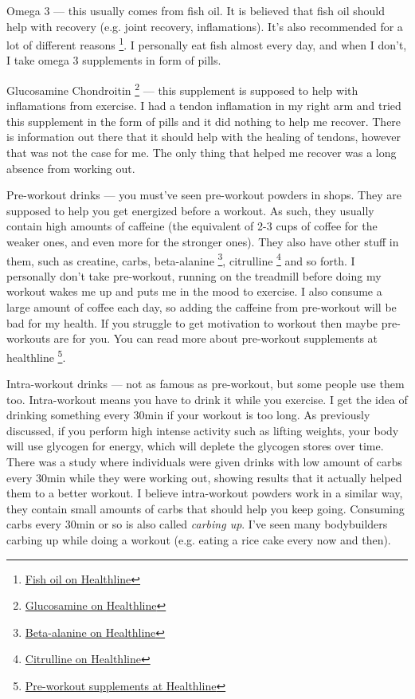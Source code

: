 \documentclass[openany, 12pt]{book}
\begin{document}
        Omega 3 --- this usually comes from fish oil. It is believed that fish oil should help with recovery (e.g. joint recovery, inflamations). It's also recommended for a lot of different reasons
        \footnote{\href{https://www.healthline.com/nutrition/fish-oil-bodybuilding}{Fish oil on Healthline}}. I personally eat fish almost every day, and when I don't, I take
        omega 3 supplements in form of pills.

        Glucosamine Chondroitin
        \footnote{\href{https://www.healthline.com/nutrition/glucosamine}{Glucosamine on Healthline}} --- this supplement is supposed to help with inflamations from exercise.
        I had a tendon inflamation in my right arm and tried this supplement in the form of pills and it did nothing to help me recover. There is information out there that it should help with
        the healing of tendons, however that was not the case for me. The only thing that helped me recover was a long absence from working out.

        Pre-workout drinks --- you must've seen pre-workout powders in shops. They are supposed to help you get energized before a workout. As such, they usually contain high amounts of caffeine
        (the equivalent of 2-3 cups of coffee for the weaker ones, and even more for the stronger ones). They also have other stuff in them, such as creatine, carbs, beta-alanine
        \footnote{\href{https://www.healthline.com/nutrition/beta-alanine-101}{Beta-alanine on Healthline}}, citrulline
        \footnote{\href{https://www.healthline.com/nutrition/citrulline-supplements}{Citrulline on Healthline}} and so forth. I personally don't take pre-workout, running on the treadmill
        before doing my workout wakes me up and puts me in the mood to exercise. I also consume a large amount of coffee each day, so adding the caffeine from pre-workout will be bad for my health.
        If you struggle to get motivation to workout then maybe pre-workouts are for you. You can read more about pre-workout supplements at healthline
        \footnote{\href{https://www.healthline.com/nutrition/best-pre-workout-supplements}{Pre-workout supplements at Healthline}}.

        Intra-workout drinks --- not as famous as pre-workout, but some people use them too. Intra-workout means you have to drink it while you exercise. I get the idea of drinking something every 30min
        if your workout is too long. As previously discussed, if you perform high intense activity such as lifting weights, your body will use glycogen for energy, which will deplete the glycogen stores
        over time. There was a study where individuals were given drinks with low amount of carbs every 30min while they were working out, showing results that it actually helped them to a better
        workout. I believe intra-workout powders work in a similar way, they contain small amounts of carbs that should help you keep going. Consuming carbs every 30min or so is also
        called \textit{carbing up}. I've seen many bodybuilders carbing up while doing a workout (e.g. eating a rice cake every now and then).
\end{document}
